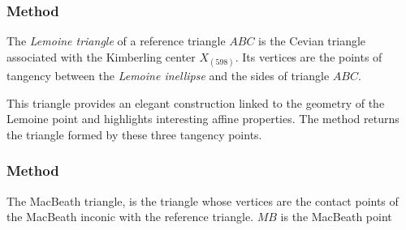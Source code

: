 \subsubsection{Method }
\label{ssub:method_triangle_lemoine}

The \emph{Lemoine triangle} of a reference triangle $ABC$ is the Cevian triangle associated with the Kimberling center $X_{(598)}$. Its vertices are the points of tangency between the \emph{Lemoine inellipse} and the sides of triangle $ABC$.

\medskip

This triangle provides an elegant construction linked to the geometry of the Lemoine point and highlights interesting affine properties. The method returns the triangle formed by these three tangency points.

\vspace{1em}
\begin{tkzexample}[latex=.5\textwidth]
\end{tkzexample}

\subsubsection{Method }
\label{ssub:method_triangle_macbeath}
The MacBeath triangle, is the triangle whose vertices are the contact points of the MacBeath inconic with the reference triangle. $MB$ is the MacBeath  point

\begin{tkzexample}[latex=.5\textwidth]
\end{tkzexample}


